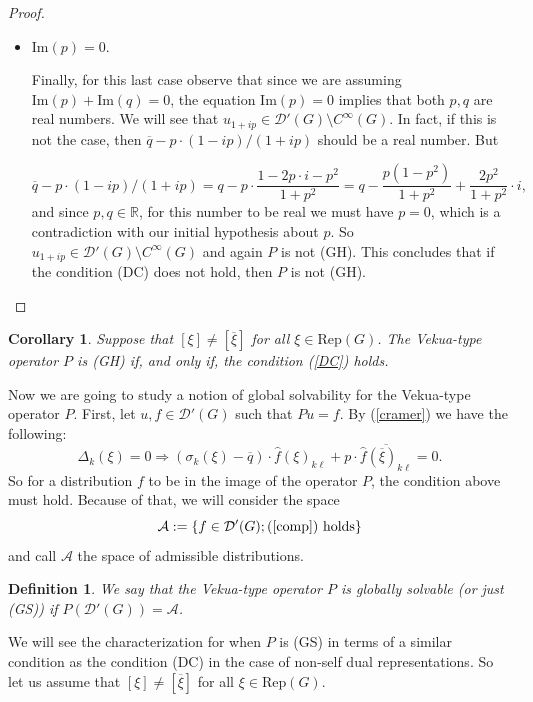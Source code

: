 \documentclass[sn-mathphys-num]{sn-jnl}%
\numberwithin{equation}{section}
\theoremstyle{thmstyleone}
\newtheorem{corollary}[theorem]{Corollary}
\theoremstyle{thmstyletwo}
\theoremstyle{thmstylethree}
\newtheorem{definition}{Definition}[section]
\renewcommand{\Im}{\textrm{Im}}
\begin{document}
\begin{proof}
\begin{itemize}
\item[2.2)] $\Im(p) =0$.

Finally, for this last case observe that since we are assuming $\Im(p)+\Im(q)=0$, the equation $\Im(p)=0$ implies that both $p,q$ are real numbers. We will see that $u_{1+ip} \in \mathcal{D}'(G)\setminus C^\infty(G)$. In fact, if this is not the case, then $\overline{q}-p \cdot (1-ip)/(1+ip)$ should be a real number. But

$$\overline{q}-p \cdot (1-ip)/(1+ip) = q-p \cdot \frac{1-2 p \cdot i -p^2}{1+p^2} =q-\frac{p(1-p^2)}{1+p^2}+\frac{2p^2}{1+p^2} \cdot i,$$
and since $p,q \in \mathbb{R}$, for this number to be real we must have $p=0$, which is a contradiction with our initial hypothesis about $p$. So $u_{1+ip} \in \mathcal{D}'(G)\setminus C^\infty(G)$ and again $P$ is not (GH). This concludes that if the condition (DC) does not hold, then $P$ is not (GH).
\end{itemize}
\end{proof}

\begin{corollary} Suppose that $[\xi] \neq [\overline{\xi}]$ for all $\xi \in \textrm{Rep}(G)$. The Vekua-type operator $P$ is (GH) if, and only if, the condition (\ref{DC}) holds.
\end{corollary}

Now we are going to study a notion of global solvability for the Vekua-type operator $P$. First, let $u,f \in \mathcal{D}'(G)$ such that $Pu=f$. By (\ref{cramer}) we have the following:
\begin{equation}\label{comp}
	\Delta_k(\xi)=0 \Rightarrow (\sigma_k(\xi)-\overline{q})\cdot \widehat{f}(\xi)_{k\ell}+p \cdot \overline{ \widehat{f}(\overline{\xi})_{k\ell}} =0.
\end{equation} 
So for a distribution $f$ to be in the image of the operator $P$, the condition above must hold. Because of that, we will consider the space
\begin{equation}\label{setA} \mathcal{A}:=\{ f \in \mathcal{D}'(G);(\ref{comp}) \textrm{ holds} \}
\end{equation} 
and call $\mathcal{A}$ the space of admissible distributions. 

\begin{definition} We say that the Vekua-type operator $P$ is globally solvable (or just (GS)) if $P(\mathcal{D}'(G)) = \mathcal{A}$.
\end{definition}

We will see the characterization for when $P$ is (GS) in terms of a similar condition as the condition (DC) in the case of non-self dual representations. So let us assume that $[\xi] \neq [\overline{\xi}]$ for all $\xi \in \textrm{Rep}(G)$.
\end{document}
